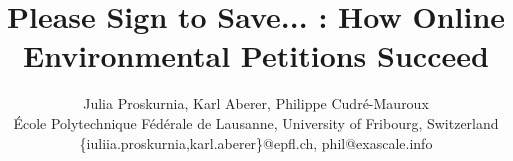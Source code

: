 \documentclass[letterpaper]{article}
\begin{document}

\title{Please Sign to Save... : How Online Environmental Petitions Succeed}

%
\author{
%
%
Julia Proskurnia, Karl Aberer, Philippe Cudr\'{e}-Mauroux \\
\'{E}cole Polytechnique F\'{e}d\'{e}rale de Lausanne, University of Fribourg, Switzerland \\ 
\{iuliia.proskurnia,karl.aberer\}@epfl.ch, phil@exascale.info \\
}

\maketitle
\end{document}
